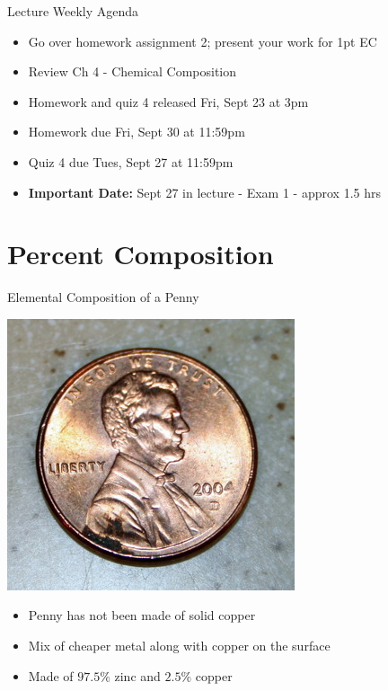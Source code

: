 \documentclass[11pt]{beamer}
\begin{document}
\begin{frame}{Lecture Weekly Agenda}
  \begin{itemize}
  \item Go over homework assignment 2; present your work
    for 1pt EC
  \item Review Ch 4 - Chemical Composition
  \item Homework and quiz 4 released Fri, Sept 23 at 3pm
  \item Homework due Fri, Sept 30 at 11:59pm
  \item Quiz 4 due Tues, Sept 27 at 11:59pm
  \item \textbf{Important Date:} Sept 27 in lecture -
    Exam 1 - approx 1.5 hrs
  \end{itemize}
\end{frame}

\section{Percent Composition}

\begin{frame}{Elemental Composition of a Penny}
  \begin{center}
    \includegraphics[scale=0.3]{penny_2004}
  \end{center}

  \begin{itemize}
  \item Penny has not been made of solid copper
  \item Mix of cheaper metal along with copper on the surface
  \item Made of $97.5\%$ zinc and $2.5\%$ copper
  \end{itemize}
\end{frame}
\end{document}
